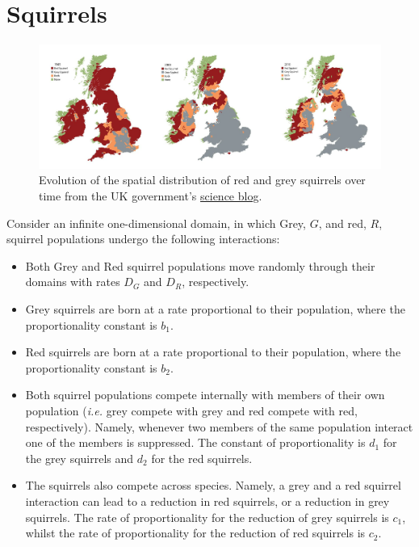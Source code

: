 \documentclass[10pt]{article}
\newcommand{\ie}{\emph{i.e.} }
\begin{document}
\section{Squirrels}\label{Squirrels}
\begin{figure}[h!!!tb]
\centering
\includegraphics[width=\textwidth]{../../Pictures/SquirrelMap.png}
\caption{\label{SquirrelMap} Evolution of the spatial distribution of red and grey squirrels over time from the UK government's \href{https://aphascience.blog.gov.uk/2018/10/09/red-squirrel/}{science blog}.}
\end{figure}
Consider an infinite one-dimensional domain, in which Grey, $G$, and red, $R$, squirrel populations undergo the following interactions:
\begin{itemize}
\item Both Grey and Red squirrel populations move randomly through their domains with rates $D_G$ and $D_R$, respectively.
\item Grey squirrels are born at a rate proportional to their population, where the proportionality constant is $b_1$.
\item Red squirrels are born at a rate proportional to their population, where the proportionality constant is $b_2$.
\item Both squirrel populations compete internally with members of their own population (\ie grey compete with grey and red compete with red, respectively). Namely, whenever two members of the same population interact one of the members is suppressed. The constant of proportionality is $d_1$ for the grey squirrels and $d_2$ for the red squirrels.
\item The squirrels also compete across species. Namely, a grey and a red squirrel interaction can lead to a reduction in red squirrels, or a reduction in grey squirrels. The rate of proportionality for the reduction of grey squirrels is $c_1$, whilst the rate of proportionality for the reduction of red squirrels is $c_2$.
\end{itemize}
\end{document}
